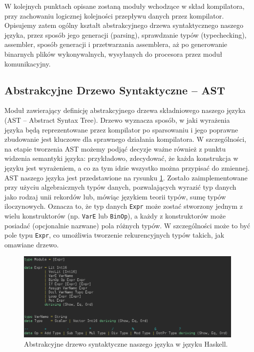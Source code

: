 W kolejnych punktach opisane zostaną moduły wchodzące w skład kompilatora, przy zachowaniu logicznej kolejności przepływu danych przez kompilator. Opisujemy zatem ogólny kształt  abstrakcyjnego drzewa syntaktycznego naszego języka, przez sposób jego generacji (parsing), sprawdzanie typów (typechecking), assembler, sposób generacji i przetwarzania assemblera, aż po generowanie binarnych plików wykonywalnych, wysyłanych do procesora przez moduł komunikacyjny.

\subsection{Abstrakcyjne Drzewo Syntaktyczne -- AST}

Moduł zawierający definicję abstrakcyjnego drzewa składniowego naszego języka (AST -- Abstract Syntax Tree). Drzewo wyznacza sposób, w jaki wyrażenia języka będą reprezentowane przez kompilator po sparsowaniu i jego poprawne zbudowanie jest kluczowe dla sprawnego działania kompilatora. W szczególności, na etapie tworzenia AST możemy podjąć decyzje ważne również z punktu widzenia semantyki języka: przykładowo, zdecydować, że każda konstrukcja w języku jest wyrażeniem, a co za tym idzie wszystko można przypisać do zmiennej. AST naszego języka jest przedstawione na rysunku \ref{fig:ast}. Zostało zaimplementowane przy użyciu algebraicznych typów danych, pozwalających wyrazić typ danych jako rodzaj unii rekordów lub, mówiąc językiem teorii typów, sumę typów iloczynowych. Oznacza to, że typ danych \texttt{Expr} może zostać stworzony jednym z wielu konstruktorów (np. \texttt{VarE} lub \texttt{BinOp}), a każdy z konstruktorów może posiadać (opcjonalnie nazwane) pola różnych typów. W szczególności może to być pole typu \texttt{Expr}, co umożliwia tworzenie rekurencyjnych typów takich, jak omawiane drzewo.

\begin{figure}
  \begin{center}
    \includegraphics[scale=0.5]{images/AST.png}
    \caption{Abstrakcyjne drzewo syntaktyczne naszego języka w języku Haskell.}
    \label{fig:ast}
  \end{center}
\end{figure}

